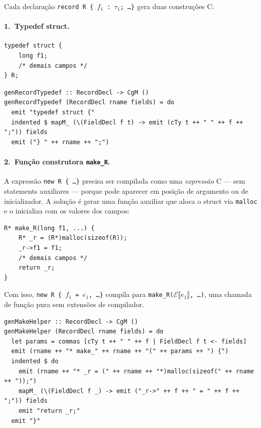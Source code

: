 Cada declaração \texttt{record R \{ $f_1$ : $\tau_1$; \ldots \}} gera duas
construções C:

\paragraph{1.\ Typedef struct.}

\begin{verbatim}
typedef struct {
    long f1;
    /* demais campos */
} R;
\end{verbatim}

\begin{verbatim}
genRecordTypedef :: RecordDecl -> CgM ()
genRecordTypedef (RecordDecl rname fields) = do
  emit "typedef struct {"
  indented $ mapM_ (\(FieldDecl f t) -> emit (cTy t ++ " " ++ f ++ ";")) fields
  emit ("} " ++ rname ++ ";")
\end{verbatim}

\paragraph{2.\ Função construtora \texttt{make\_R}.}

A expressão \texttt{new R \{ \ldots \}} precisa ser compilada como uma
\emph{expressão} C — sem statements auxiliares — porque pode aparecer em
posição de argumento ou de inicializador.  A solução é gerar uma função
auxiliar que aloca o struct via \texttt{malloc} e o inicializa com os valores
dos campos:

\begin{verbatim}
R* make_R(long f1, ...) {
    R* _r = (R*)malloc(sizeof(R));
    _r->f1 = f1;
    /* demais campos */
    return _r;
}
\end{verbatim}

Com isso, \texttt{new R \{ $f_1$ = $e_1$, \ldots \}} compila para
\texttt{make\_R($\mathcal{E}\llbracket e_1 \rrbracket$, \ldots)}, uma chamada
de função pura sem extensões de compilador.

\begin{verbatim}
genMakeHelper :: RecordDecl -> CgM ()
genMakeHelper (RecordDecl rname fields) = do
  let params = commas [cTy t ++ " " ++ f | FieldDecl f t <- fields]
  emit (rname ++ "* make_" ++ rname ++ "(" ++ params ++ ") {")
  indented $ do
    emit (rname ++ "* _r = (" ++ rname ++ "*)malloc(sizeof(" ++ rname ++ "));")
    mapM_ (\(FieldDecl f _) -> emit ("_r->" ++ f ++ " = " ++ f ++ ";")) fields
    emit "return _r;"
  emit "}"
\end{verbatim}

